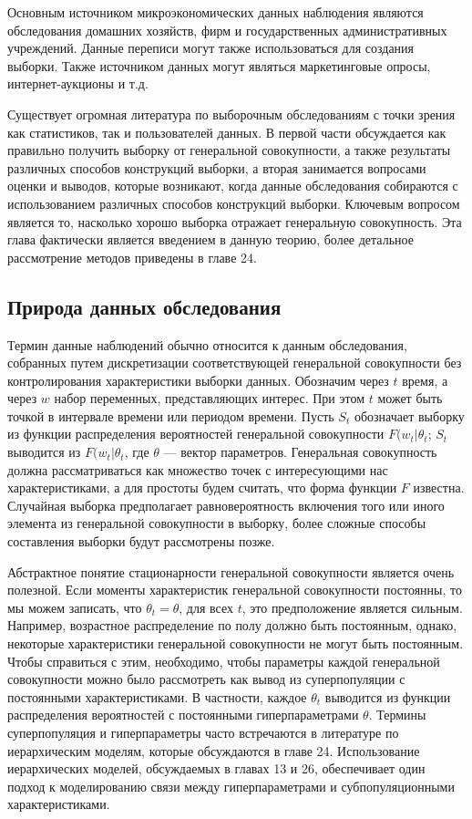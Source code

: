 	
Основным источником микроэкономических данных наблюдения являются обследования домашних хозяйств, фирм и государственных административных учреждений. Данные переписи могут также использоваться для создания выборки. Также  источником данных могут являться маркетинговые опросы, интернет-аукционы и т.д. 


Существует огромная литература по выборочным обследованиям с точки зрения как статистиков, так и пользователей данных. В первой части обсуждается как правильно получить выборку от генеральной совокупности, а также результаты различных способов конструкций выборки, а вторая занимается вопросами оценки и выводов, которые возникают, когда данные обследования собираются с использованием различных способов конструкций выборки. Ключевым вопросом является то, насколько хорошо выборка отражает генеральную совокупность. Эта глава фактически является введением в данную теорию, более детальное рассмотрение методов приведены в главе 24.
	

\subsection{Природа данных обследования}


Термин данные наблюдений обычно относится к данным обследования, собранных путем дискретизации соответствующей генеральной совокупности без контролирования характеристики выборки данных. Обозначим через $t$ время, а через $w$  набор переменных, представляющих интерес. При этом  $t$ может быть точкой в интервале времени или периодом времени. Пусть $S_{t}$ обозначает выборку из функции распределения вероятностей генеральной совокупности $F(w_{t}|\theta_{t}$; $S_{t}$ выводится из $F(w_{t}|\theta_{t}$, где $\theta$ --- вектор параметров. Генеральная совокупность должна рассматриваться как множество точек с интересующими нас характеристиками, а для простоты будем считать, что форма функции $F$ известна. Случайная выборка предполагает равновероятность включения того или иного элемента из генеральной совокупности в выборку, более сложные способы составления выборки будут рассмотрены позже.


Абстрактное понятие стационарности генеральной совокупности является очень полезной. Если моменты характеристик генеральной совокупности постоянны, то мы можем записать, что $\theta_{t}=\theta$, для всех $t$, это предположение является сильным. Например, возрастное распределение по полу должно быть постоянным, однако, некоторые характеристики генеральной совокупности не могут быть постоянным. Чтобы справиться с этим, необходимо, чтобы параметры каждой генеральной совокупности можно было рассмотреть как вывод из суперпопуляции с постоянными характеристиками. В частности, каждое $\theta_{t}$ выводится  из функции распределения вероятностей с постоянными гиперпараметрами $\theta$. Термины суперпопуляция и гиперпараметры часто встречаются в литературе по иерархическим моделям, которые обсуждаются в главе 24. Использование иерархических моделей, обсуждаемых в главах 13 и 26, обеспечивает один подход к моделированию связи между гиперпараметрами и субпопуляционными характеристиками.


